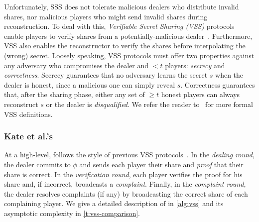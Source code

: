 % 
Unfortunately, SSS does not tolerate malicious dealers who distribute invalid shares, nor malicious players who might send invalid shares during reconstruction.
To deal with this, \textit{Verifiable Secret Sharing (VSS)} protocols enable players to verify shares from a potentially-malicious dealer~\cite{CGMA85,Feldman1987Practical,Pedersen1991Noninteractive,polycommit}.
Furthermore, VSS also enables the reconstructor to verify the shares before interpolating the (wrong) secret.
Loosely speaking, VSS protocols must offer two properties against any adversary who compromises the dealer and $<t$ players: \textit{secrecy} and \textit{correctness}.
Secrecy guarantees that no adversary learns the secret $s$ when the dealer is honest, since a malicious one can simply reveal $s$.
Correctness guarantees that, after the sharing phase, either any set of $\ge t$ honest players can always reconstruct $s$ or the dealer is \textit{disqualified}.
We refer the reader to~\cite{polycommit} for more formal VSS definitions. %


\subsubsection{Kate et al.'s \evss}
\label{s:prelim:evss}
At a high-level, \evss follows the style of previous VSS protocols~\cite{Feldman1987Practical,Pedersen1991Noninteractive}.
In the \textit{dealing round}, the dealer commits to $\phi$ and sends each player their share and \textit{proof} that their share is correct.
In the \textit{verification round}, each player verifies the proof for his share and, if incorrect, broadcasts a \textit{complaint}.
Finally, in the \textit{complaint round}, the dealer resolves complaints (if any) by broadcasting the correct share of each complaining player.
We give a detailed description of \evss in \cref{alg:vss} and its asymptotic complexity in \cref{t:vss-comparison}.

